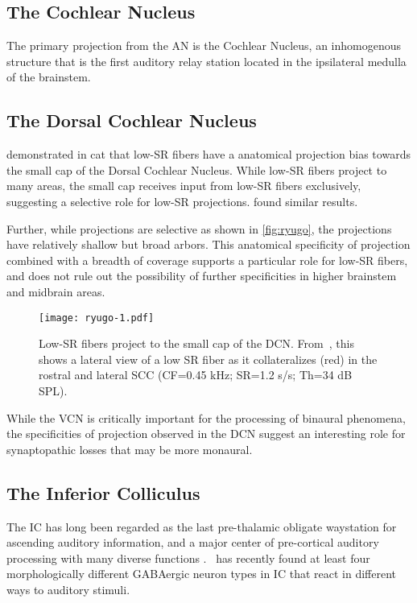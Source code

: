 \subsection{The Cochlear Nucleus} %
\label{sub:the_cochlear_nucleus}
The primary projection from the AN is the Cochlear Nucleus, an inhomogenous structure that is the first auditory relay station located in the ipsilateral medulla of the brainstem.  
\subsection{The Dorsal Cochlear Nucleus} %
\label{sub:the_dorsal_cochlear_nucleus}
\cite{Ryugo2008Projections} demonstrated in cat that low-SR fibers have a anatomical projection bias towards the small cap of the Dorsal Cochlear Nucleus.  While low-SR fibers project to many areas, the small cap receives input from low-SR fibers exclusively, suggesting a selective role for low-SR projections. \cite{Liberman1993Central} found similar results. 

Further, while projections are selective as shown in \autoref{fig:ryugo}, the projections have relatively shallow but broad arbors. This anatomical specificity of projection combined with a breadth of coverage supports a particular role for low-SR fibers, and does not rule out the possibility of further specificities in higher brainstem and midbrain areas. 

\begin{figure}[htbp]
	\centering
	\texttt{[image: ryugo-1.pdf]}
	\caption[Low SR Fibers Project to the Small Cap]{Low-SR fibers project to the small cap of the DCN.  From~\cite{Ryugo2008Projections}, this shows a lateral view of a low SR fiber as it collateralizes (red) in the rostral and lateral SCC (CF=0.45 kHz; SR=1.2 s/s; Th=34 dB SPL).}
	\label{fig:ryugo}
\end{figure}

While the VCN is critically important for the processing of binaural phenomena, the specificities of projection observed in the DCN suggest an interesting role for synaptopathic losses that may be more monaural.
\subsection{The Inferior Colliculus} %
\label{sub:the_inferior_colliculus}
The IC has long been regarded as the last pre-thalamic obligate waystation for ascending auditory information, and a major center of pre-cortical auditory processing with many diverse functions \citep{Cant2005Atlas,Covey2008Inputs,Moore1985Projections}.~\cite{Beebe2016Extracellular} has recently found at least four morphologically different GABAergic neuron types in IC that react in different ways to auditory stimuli.

